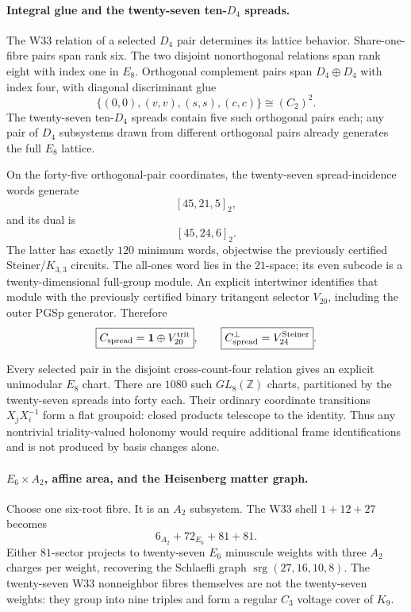 \paragraph{Integral glue and the twenty-seven ten-$D_4$ spreads.}
The W33 relation of a selected $D_4$ pair determines its lattice behavior.  Share-one-fibre pairs span rank six.  The two disjoint nonorthogonal relations span rank eight with index one in $E_8$.  Orthogonal complement pairs span $D_4\oplus D_4$ with index four, with diagonal discriminant glue
\[
  \boxed{\{(0,0),(v,v),(s,s),(c,c)\}\cong(C_2)^2}.
\]
The twenty-seven ten-$D_4$ spreads contain five such orthogonal pairs each; any pair of $D_4$ subsystems drawn from different orthogonal pairs already generates the full $E_8$ lattice.

On the forty-five orthogonal-pair coordinates, the twenty-seven spread-incidence words generate
\[
  \boxed{[45,21,5]_2},
\]
and its dual is
\[
  \boxed{[45,24,6]_2}.
\]
The latter has exactly $120$ minimum words, objectwise the previously certified Steiner/$K_{3,3}$ circuits.  The all-ones word lies in the $21$-space; its even subcode is a twenty-dimensional full-group module.  An explicit intertwiner identifies that module with the previously certified binary tritangent selector $V_{20}$, including the outer PGSp generator.  Therefore
\[
  \boxed{C_{\rm spread}=\mathbf 1\oplus V_{20}^{\rm trit}},
  \qquad
  \boxed{C_{\rm spread}^{\perp}=V_{24}^{\rm Steiner}}.
\]

Every selected pair in the disjoint cross-count-four relation gives an explicit unimodular $E_8$ chart.  There are $1080$ such $GL_8(\mathbb Z)$ charts, partitioned by the twenty-seven spreads into forty each.  Their ordinary coordinate transitions $X_jX_i^{-1}$ form a flat groupoid: closed products telescope to the identity.  Thus any nontrivial triality-valued holonomy would require additional frame identifications and is not produced by basis changes alone.

\paragraph{$E_6\times A_2$, affine area, and the Heisenberg matter graph.}
Choose one six-root fibre.  It is an $A_2$ subsystem.  The W33 shell $1+12+27$ becomes
\[
  \boxed{6_{A_2}+72_{E_6}+81+81}.
\]
Either $81$-sector projects to twenty-seven $E_6$ minuscule weights with three $A_2$ charges per weight, recovering the Schlaefli graph $\operatorname{srg}(27,16,10,8)$.  The twenty-seven W33 nonneighbor fibres themselves are not the twenty-seven weights: they group into nine triples and form a regular $C_3$ voltage cover of $K_9$.


